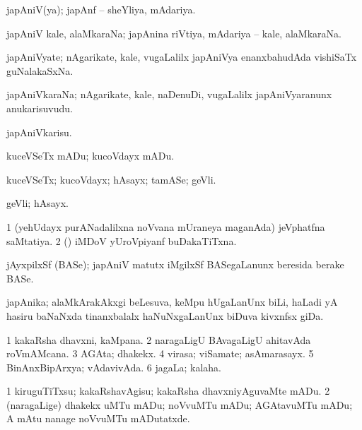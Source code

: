 \bentry
{}
\gl{\gu}
\bmng
japAniV(ya); japAnf -- sheYliya, mAdariya. 
\emng
\eentry

\bentry
{}
\gl{\nA}
\bmng
japAniV kale, alaMkaraNa; japAnina riVtiya, mAdariya -- kale, alaMkaraNa. 
\emng
\eentry

\bentry
{}
\gl{\nA}
\bmng
japAniVyate; nAgarikate, kale, \mo vugaLalilx japAniVya enanxbahudAda vishiSaTx guNalakaSxNa. 
\emng
\eentry

\bentry
{}
\gl{\nA}
\bmng
japAniVkaraNa; nAgarikate, kale, naDenuDi, \mo vugaLalilx japAniVyaranunx anukarisuvudu. 
\emng
\eentry

\bentry
{}
\gl{\sakirx}
\bmng
japAniVkarisu. 
\emng
\eentry

\bentry
{}
\gl{\akirx}
\bmng
kuceVSeTx mADu; kucoVdayx mADu. 
\emng
\eentry


\bentry
{}
\gl{\nA}
\bmng
kuceVSeTx; kucoVdayx; hAsayx; tamASe; geVli. 
\emng
\eentry

\bentry
{}
\gl{\nA}
\bmng
geVli; hAsayx. 
\emng
\eentry

\bentry
{}
\gl{\gu}
\bmng
\bnum
\num{1} (yehUdayx purANadalilxna noVvana mUraneya maganAda) jeVphatfna saMtatiya. 
\num{2} (\pArxparx) iMDoV yUroVpiyanf buDakaTiTxna. 
\enum
\emng
\eentry

\bentry
{}
\gl{\nA}
\bmng
jAyxpilxSf (BASe); japAniV matutx iMgilxSf BASegaLanunx beresida berake BASe. 
\emng
\eentry

\bentry
{}
\gl{\nA}
\bmng
japAnika; alaMkArakAkxgi beLesuva, keMpu hUgaLanUnx biLi, haLadi yA hasiru baNaNxda tinanxbalalx haNuNxgaLanUnx biDuva kivxnfsx giDa. 
\emng
\eentry

\bentry
{}
\gl{\nA}
\bmng
\bnum
\num{1} kakaRsha dhavxni, kaMpana. 
\num{2} naragaLigU BAvagaLigU ahitavAda roVmAMcana. 
\num{3} AGAta; dhakekx. 
\num{4} virasa; viSamate; asAmarasayx. 
\num{5} BinAnxBipArxya; vAdavivAda. 
\num{6} jagaLa; kalaha. 
\enum
\emng
\eentry

\bentry
{}
\gl{\kirx}
\bmng
\emng

\noindent
\gl{\sakirx}
\bmng
\bnum
\num{1} kiruguTiTxsu; kakaRshavAgisu; kakaRsha dhavxniyAguvaMte mADu. 
\num{2} (naragaLige) dhakekx uMTu mADu; noVvuMTu mADu; AGAtavuMTu mADu;  A mAtu nanage noVvuMTu mADutatxde. 
\enum
\emng

